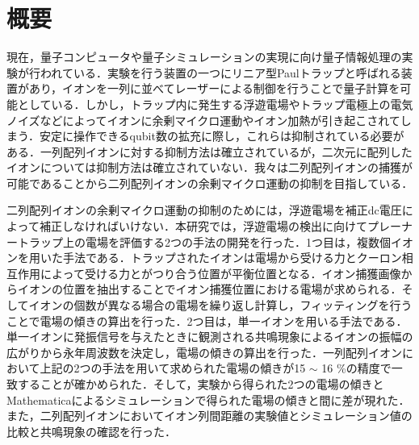 \chapter{概要}
現在，量子コンピュータや量子シミュレーションの実現に向け量子情報処理の実験が行われている．実験を行う装置の一つにリニア型Paulトラップと呼ばれる装置があり，イオンを一列に並べてレーザーによる制御を行うことで量子計算を可能としている．しかし，トラップ内に発生する浮遊電場やトラップ電極上の電気ノイズなどによってイオンに余剰マイクロ運動やイオン加熱が引き起こされてしまう．安定に操作できるqubit数の拡充に際し，これらは抑制されている必要がある．一列配列イオンに対する抑制方法は確立されているが，二次元に配列したイオンについては抑制方法は確立されていない．我々は二列配列イオンの捕獲が可能であることから二列配列イオンの余剰マイクロ運動の抑制を目指している．

二列配列イオンの余剰マイクロ運動の抑制のためには，浮遊電場を補正dc電圧によって補正しなければいけない．本研究では，浮遊電場の検出に向けてプレーナートラップ上の電場を評価する2つの手法の開発を行った．1つ目は，複数個イオンを用いた手法である．トラップされたイオンは電場から受ける力とクーロン相互作用によって受ける力とがつり合う位置が平衡位置となる．イオン捕獲画像からイオンの位置を抽出することでイオン捕獲位置における電場が求められる．そしてイオンの個数が異なる場合の電場を繰り返し計算し，フィッティングを行うことで電場の傾きの算出を行った．2つ目は，単一イオンを用いる手法である．単一イオンに発振信号を与えたときに観測される共鳴現象によるイオンの振幅の広がりから永年周波数を決定し，電場の傾きの算出を行った．一列配列イオンにおいて上記の2つの手法を用いて求められた電場の傾きが15 $\sim$ 16 \%の精度で一致することが確かめられた．そして，実験から得られた2つの電場の傾きとMathematicaによるシミュレーションで得られた電場の傾きと間に差が現れた．また，二列配列イオンにおいてイオン列間距離の実験値とシミュレーション値の比較と共鳴現象の確認を行った．
